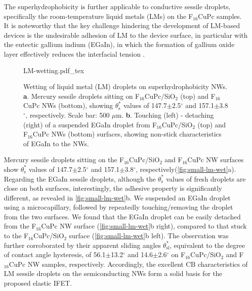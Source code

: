 The superhydrophobicity is further applicable to conductive sessile droplets,
specifically the room-temperature liquid metals\autocite{Dickey_2008_EGAIN} (LMs) on the
F\(_{\text{16}}\)CuPc samples.
%
It is noteworthy that the key challenge hindering
the development of LM-based devices is the undesirable adhesion of LM
to the device surface, in particular with the eutectic gallium indium
(EGaIn), in which the formation of gallium oxide layer effectively
reduces the interfacial tension
\autocite{Dickey_2008_EGAIN,Doudrick_2014_oxide}.
%
\begin{figure}[htbp]
  \centering
  {LM-wetting.pdf_tex}
  \caption{\label{fig:small-lm-wet} Wetting of liquid
    metal (LM) droplets on superhydrophobicity NWs.
    \textbf{a}. Mercury sessile droplets sitting on
    F\(_{\text{16}}\)CuPc/SiO\(_{\text{2}}\) (top) and
    F\(_{\text{16}}\)CuPc NWs (bottom), showing
    \(\theta_{\mathrm{s}}^{*}\) values of 147.7\(\pm\)2.5\(^{\circ}\)
    and 157.1\(\pm\)3.8\(^{\circ}\), respectively. Scale bar: 500
    \(\mu\)m. \textbf{b}. Touching (left) - detaching (right) of a
    suspended EGaIn droplet from
    F\(_{\text{16}}\)CuPc/SiO\(_{\text{2}}\) (top) and
    F\(_{\text{16}}\)CuPc NWs (bottom) surfaces, showing non-stick
    characteristics of EGaIn to the NWs.}
\end{figure}
Mercury sessile droplets sitting on the
F\(_{\text{16}}\)CuPc/SiO\(_{\text{2}}\) and F\(_{\text{16}}\)CuPc NW
surfaces show \(\theta_{\mathrm{s}}^{*}\) values of
147.7\(\pm\)2.5\(^{\circ}\) and 157.1\(\pm\)3.8\(^{\circ}\),
respectively(\autoref{fig:small-lm-wet}a).  Regarding the EGaIn
sessile droplets, although the \(\theta_{\mathrm{s}}^{*}\) values of
fresh droplets are close on both surfaces, interestingly, the adhesive
property is significantly different, as revealed in
\autoref{fig:small-lm-wet}b. We suspended an EGaIn droplet using a
microcapillary, followed by repeatedly touching/removing the droplet
from the two surfaces. We found that the EGaIn droplet can be easily
detached from the F\(_{\text{16}}\)CuPc NW surface (\autoref{fig:small-lm-wet}b right), compared to that stuck to the
F\(_{\text{16}}\)CuPc/SiO\(_{\text{2}}\) surface
(\autoref{fig:small-lm-wet}b left). The observation was further
corroborated by their apparent sliding angles
\(\theta_{\mathrm{sl}}^{*}\), equivalent to the degree of contact
angle hysteresis, of 56.1\(\pm\)13.2\(^{\circ}\) and
14.6\(\pm\)2.6\(^{\circ}\) on F\(_{\text{16}}\)CuPc/SiO\(_{\text{2}}\)
and F\(_{\text{16}}\)CuPc NW samples, respectively. Accordingly, the
excellent CB characteristics of LM sessile droplets on the
semiconducting NWs form a solid basis for the proposed elastic IFET.


